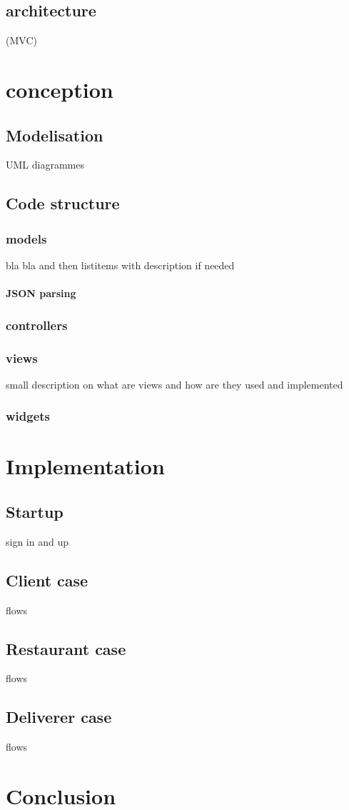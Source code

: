 \documentclass[a4paper]{report}
\begin{document}
	\section{architecture} (MVC) %

\newpage
\chapter{conception}
	\section{Modelisation} UML diagrammes
	\section{Code structure}
		\subsection{models} %
			bla bla and then listitems with description if needed
			\subsubsection{JSON parsing}
		\subsection{controllers}
		\subsection{views}
		small description on what are views and how are they used and implemented
		\subsection{widgets}
		
\newpage
\chapter{Implementation}
	\section{Startup} sign in and up
	\section{Client case} flows
	\section{Restaurant case} flows
	\section{Deliverer case} flows

\newpage
\chapter*{Conclusion}

\newpage
\begin{thebibliography}{300}
\end{thebibliography}
\end{document}
